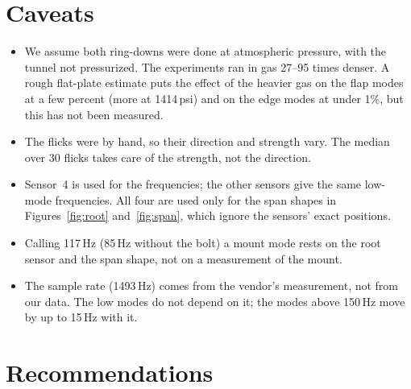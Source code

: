 \documentclass[11pt]{article}
\begin{document}
\section{Caveats}

\begin{itemize}
  \item We assume both ring-downs were done at atmospheric pressure, with the
        tunnel not pressurized. The experiments ran in gas 27--95 times
        denser. A rough flat-plate estimate puts the effect of the heavier gas
        on the flap modes at a few percent (more at 1414\,psi) and on the
        edge modes at under 1\%, but this has not been measured.
  \item The flicks were by hand, so their direction and strength vary. The
        median over 30 flicks takes care of the strength, not the direction.
  \item Sensor~4 is used for the frequencies; the other sensors give the same
        low-mode frequencies. All four are used only for the span shapes in
        Figures~\ref{fig:root} and~\ref{fig:span}, which ignore the sensors'
        exact positions.
  \item Calling 117\,Hz (85\,Hz without the bolt) a mount mode rests on the
        root sensor and the span shape, not on a measurement of the mount.
  \item The sample rate (1493\,Hz) comes from the vendor's measurement, not
        from our data. The low modes do not depend on it; the modes above
        150\,Hz move by up to 15\,Hz with it.
\end{itemize}

\section{Recommendations}
\end{document}
